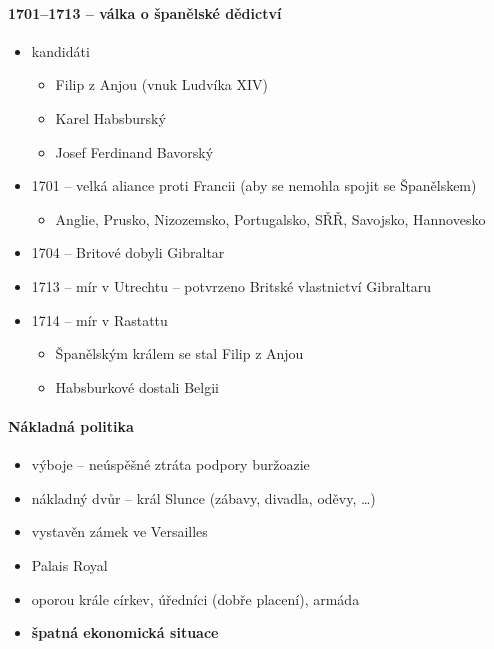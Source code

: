 \paragraph{1701--1713 -- válka o španělské dědictví}
\begin{itemize}
\item kandidáti
	\begin{itemize}
	\item Filip z Anjou (vnuk Ludvíka XIV)
	\item Karel Habsburský
	\item Josef Ferdinand Bavorský
	\end{itemize}
\item 1701 -- velká aliance proti Francii (aby se nemohla spojit se Španělskem)
	\begin{itemize}
	\item Anglie, Prusko, Nizozemsko, Portugalsko, SŘŘ, Savojsko, Hannovesko
	\end{itemize}
\item 1704 -- Britové dobyli Gibraltar
\item 1713 -- mír v Utrechtu -- potvrzeno Britské vlastnictví Gibraltaru
\item 1714 -- mír v Rastattu
	\begin{itemize}
	\item Španělským králem se stal Filip z Anjou
	\item Habsburkové dostali Belgii
	\end{itemize}
\end{itemize}



\paragraph{Nákladná politika}
\begin{itemize}
\item výboje -- neúspěšné \ra ztráta podpory buržoazie
\item nákladný dvůr -- král Slunce (zábavy, divadla, oděvy, \ldots)
\item vystavěn zámek ve Versailles
\item Palais Royal
\item oporou krále církev, úředníci (dobře placení), armáda
\item[\ra] \textbf{špatná ekonomická situace}
\end{itemize}

